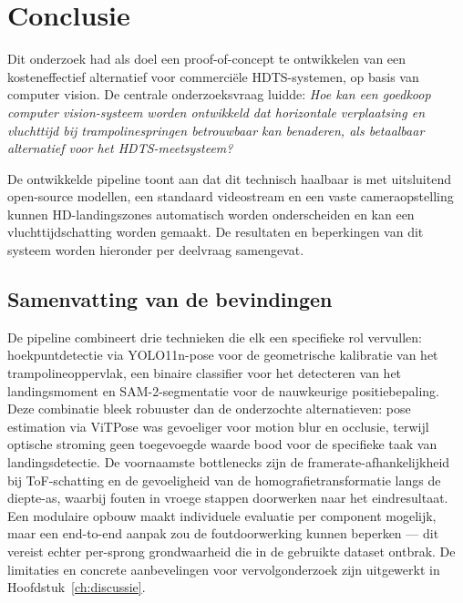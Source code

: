 
\chapter{Conclusie}%
\label{ch:conclusie}

Dit onderzoek had als doel een proof-of-concept te ontwikkelen van een kosteneffectief alternatief voor commerciële HDTS-systemen, op basis van computer vision. De centrale onderzoeksvraag luidde: \textit{Hoe kan een goedkoop computer vision-systeem worden ontwikkeld dat horizontale verplaatsing en vluchttijd bij trampolinespringen betrouwbaar kan benaderen, als betaalbaar alternatief voor het HDTS-meetsysteem?}

De ontwikkelde pipeline toont aan dat dit technisch haalbaar is met uitsluitend open-source modellen, een standaard videostream en een vaste cameraopstelling kunnen HD-landingszones automatisch worden onderscheiden en kan een vluchttijdschatting worden gemaakt. De resultaten en beperkingen van dit systeem worden hieronder per deelvraag samengevat.

\section*{Samenvatting van de bevindingen}

De pipeline combineert drie technieken die elk een specifieke rol vervullen: hoekpuntdetectie via YOLO11n-pose voor de geometrische kalibratie van het trampolineoppervlak, een binaire classifier voor het detecteren van het landingsmoment en SAM-2-segmentatie voor de nauwkeurige positiebepaling. Deze combinatie bleek robuuster dan de onderzochte alternatieven: pose estimation via ViTPose was gevoeliger voor motion blur en occlusie, terwijl optische stroming geen toegevoegde waarde bood voor de specifieke taak van landingsdetectie. De voornaamste bottlenecks zijn de framerate-afhankelijkheid bij ToF-schatting en de gevoeligheid van de homografietransformatie langs de diepte-as, waarbij fouten in vroege stappen doorwerken naar het eindresultaat. Een modulaire opbouw maakt individuele evaluatie per component mogelijk, maar een end-to-end aanpak zou de foutdoorwerking kunnen beperken — dit vereist echter per-sprong grondwaarheid die in de gebruikte dataset ontbrak. De limitaties en concrete aanbevelingen voor vervolgonderzoek zijn uitgewerkt in Hoofdstuk~\ref{ch:discussie}.

